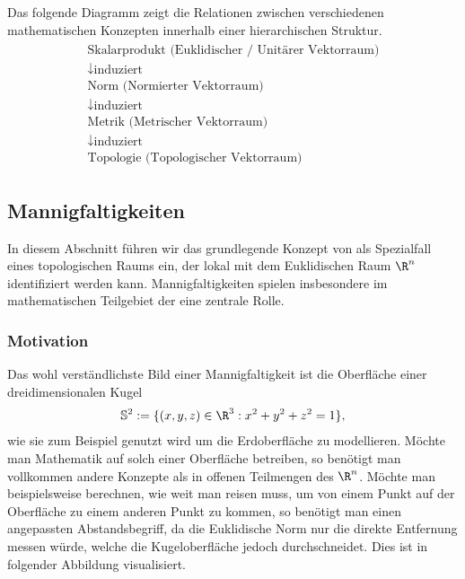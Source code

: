 \documentclass[letterpaper,10pt,german]{jupyterBook}
\begin{document}
\sphinxAtStartPar
Das folgende Diagramm zeigt die Relationen zwischen verschiedenen mathematischen Konzepten innerhalb einer hierarchischen Struktur.
\begin{equation*}
\begin{split}\begin{gathered}
\text{Skalarprodukt (Euklidischer / Unitärer Vektorraum)}\\
\downarrow \text{induziert}\\
\text{Norm (Normierter Vektorraum)}\\
\downarrow \text{induziert}\\             
\text{Metrik (Metrischer Vektorraum)}\\
\downarrow \text{induziert}\\                 
\text{Topologie (Topologischer Vektorraum)}
\end{gathered}\end{split}
\end{equation*}

\subsection{Mannigfaltigkeiten}
\label{\detokenize{manifolds/manifolds_prelim:mannigfaltigkeiten}}\label{\detokenize{manifolds/manifolds_prelim:s-mannigfaltigkeiten}}
\sphinxAtStartPar
In diesem Abschnitt führen wir das grundlegende Konzept von  als Spezialfall eines topologischen Raums ein, der lokal mit dem Euklidischen Raum \(\R^n\) identifiziert werden kann.
Mannigfaltigkeiten spielen insbesondere im mathematischen Teilgebiet der  eine zentrale Rolle.


\subsubsection{Motivation}
\label{\detokenize{manifolds/manifolds_prelim:motivation}}
\sphinxAtStartPar
Das wohl verständlichste Bild einer Mannigfaltigkeit ist die Oberfläche einer dreidimensionalen Kugel
\begin{equation*}
\begin{split}\mathbb{S}^2 := \lbrace (x,y,z)\in\R^3 : x^2 + y^2 + z^2 = 1 \rbrace,\end{split}
\end{equation*}
\sphinxAtStartPar
wie sie zum Beispiel genutzt wird um die Erdoberfläche zu modellieren.
Möchte man Mathematik auf solch einer Oberfläche betreiben, so benötigt man vollkommen andere Konzepte als in offenen Teilmengen des \(\R^n\).
Möchte man beispielsweise berechnen, wie weit man reisen muss, um von einem Punkt auf der Oberfläche zu einem anderen Punkt zu kommen, so benötigt man einen angepassten Abstandsbegriff, da die Euklidische Norm nur die direkte Entfernung messen würde, welche die Kugeloberfläche jedoch durchschneidet.
Dies ist in folgender Abbildung visualisiert.
\end{document}
